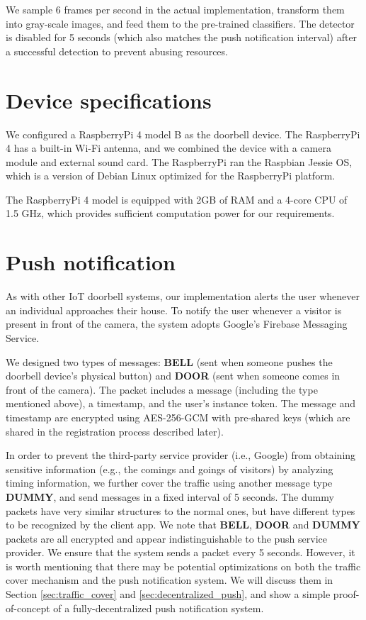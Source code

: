 We sample 6 frames per second in the actual implementation, transform them into gray-scale images, and feed them to the pre-trained classifiers. The detector is disabled for 5 seconds (which also matches the push notification interval) after a successful detection to prevent abusing resources. 

\section{Device specifications}
We configured a RaspberryPi 4 model B as the doorbell device. The RaspberryPi 4 has a built-in Wi-Fi antenna, and we combined the device with a camera module and external sound card. The RaspberryPi ran the Raspbian Jessie OS, which is a version of Debian Linux optimized for the RaspberryPi platform.

The RaspberryPi 4 model is equipped with  2GB of RAM and a 4-core CPU of 1.5 GHz, which provides sufficient computation power for our requirements.

\section{Push notification}
As with other IoT doorbell systems, our implementation alerts the user whenever an individual approaches their house. To notify the user whenever a visitor is present in front of the camera, the system adopts Google's Firebase Messaging Service.

We designed two types of messages: \textbf{BELL} (sent when someone pushes the doorbell device’s physical button) and \textbf{DOOR} (sent when someone comes in front of the camera). The packet includes a message (including the type mentioned above), a timestamp, and the user's instance token. The message and timestamp are encrypted using AES-256-GCM with pre-shared keys (which are shared in the registration process described later).

In order to prevent the third-party service provider (i.e., Google) from obtaining sensitive information (e.g., the comings and goings of visitors) by analyzing timing information, we further cover the traffic using another message type \textbf{DUMMY}, and send messages in a fixed interval of 5 seconds. The dummy packets have very similar structures to the normal ones, but have different types to be recognized by the client app. We note that \textbf{BELL}, \textbf{DOOR} and \textbf{DUMMY} packets are all encrypted and appear indistinguishable to the push service provider. We ensure that the system sends a packet every 5 seconds. However, it is worth mentioning that there may be potential optimizations on both the traffic cover mechanism and the push notification system. We will discuss them in Section \ref{sec:traffic_cover} and \ref{sec:decentralized_push}, and show a simple proof-of-concept of a fully-decentralized push notification system.




